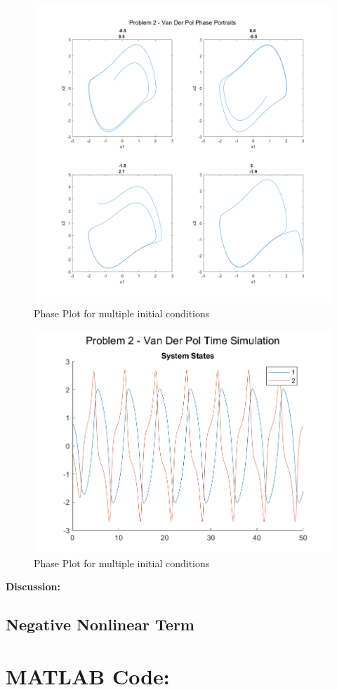 \documentclass[letter]{article}
\begin{document}
\begin{figure}[p]
	\centering
	\includegraphics[width=1\linewidth]{fig/pblm2_phase_comparrision}
	\caption{Phase Plot for multiple initial conditions}
	\label{fig:pblm2phasecomparrision}
\end{figure}

\newpage
\begin{figure}[t]
	\centering
	\includegraphics[width=0.8\linewidth]{fig/pblm2_vs_time}
	\caption{Phase Plot for multiple initial conditions}
	\label{fig:pblm2vstime}
\end{figure}


\textbf{Discussion:}


\newpage
\subsection{Negative Nonlinear Term}



\newpage
\appendix
\section{MATLAB Code:}

\end{document}
